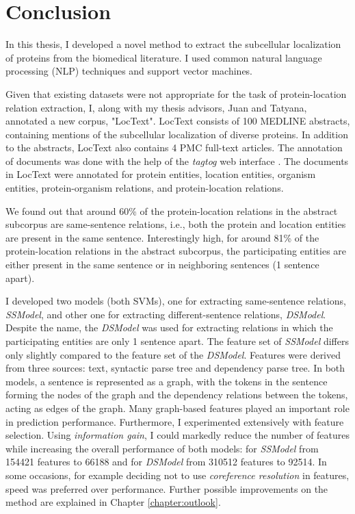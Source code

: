 \chapter{Conclusion}\label{chapter:conclusion}

In this thesis, I developed a novel method to extract the subcellular localization of proteins from the biomedical literature. I used common natural language processing (NLP) techniques and support vector machines.

Given that existing datasets were not appropriate for the task of protein-location relation extraction, I, along with my thesis advisors, Juan and Tatyana, annotated a new corpus, "LocText". LocText consists of 100 MEDLINE \cite{medline} abstracts, containing mentions of the subcellular localization of diverse proteins. In addition to the abstracts, LocText also contains 4 PMC \cite{pmc} full-text articles. The annotation of documents was done with the help of the \textit{tagtog} web interface \cite{cejuela2014tagtog}.  The documents in LocText were annotated for protein entities, location entities, organism entities, protein-organism relations, and protein-location relations.

We found out that around 60\% of the protein-location relations in the abstract subcorpus are same-sentence relations, i.e., both the protein and location entities are present in the same sentence. Interestingly high, for around 81\% of the protein-location relations in the abstract subcorpus, the participating entities are either present in the same sentence or in neighboring sentences (1 sentence apart).

I developed two models (both SVMs), one for extracting same-sentence relations, \textit{SSModel}, and other one for extracting different-sentence relations, \textit{DSModel}. Despite the name, the \textit{DSModel} was used for extracting relations in which the participating entities are only 1 sentence apart. The feature set of \textit{SSModel} differs only slightly compared to the feature set of the \textit{DSModel}. Features were derived from three sources: text, syntactic parse tree and dependency parse tree. In both models, a sentence is represented as a graph, with the tokens in the sentence forming the nodes of the graph and the dependency relations between the tokens, acting as edges of the graph. Many graph-based features played an important role in prediction performance. Furthermore, I experimented extensively with feature selection. Using \emph{information gain}, I could markedly reduce the number of features while increasing the overall performance of both models: for \textit{SSModel} from 154421 features to 66188 and for \textit{DSModel} from 310512 features to 92514. In some occasions, for example deciding not to use \emph{coreference resolution} in features, speed was preferred over performance. Further possible improvements on the method are explained in Chapter \ref{chapter:outlook}.

